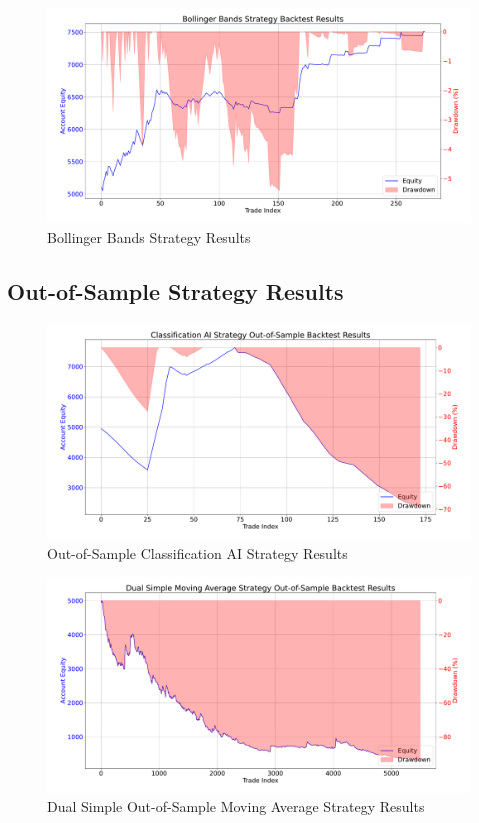 \begin{figure}[H]
    \centering
    \includegraphics[width=\textwidth]{images/backtests/bb-results}
    \caption{Bollinger Bands Strategy Results}
\end{figure}

\subsection{Out-of-Sample Strategy Results}
\label{chap:oos-strategy-results}

\begin{figure}[H]
    \centering
    \includegraphics[width=\textwidth]{images/backtests/classification-results-oof}
    \caption{Out-of-Sample Classification AI Strategy Results}
\end{figure}

\begin{figure}[H]
    \centering
    \includegraphics[width=\textwidth]{images/backtests/dual-sma-results-oof}
    \caption{Dual Simple Out-of-Sample Moving Average Strategy Results}
\end{figure}

